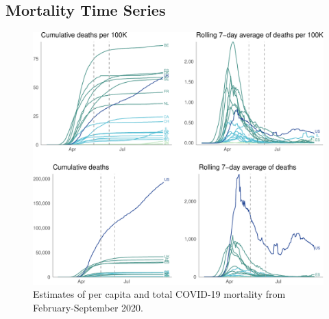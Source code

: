 \documentclass[
]{article}
\begin{document}
\hypertarget{mortality-time-series}{%
\subsection{Mortality Time Series}\label{mortality-time-series}}

\begin{figure}
\centering
\includegraphics{extended_supplement_FINAL_files/figure-latex/deaths-1.pdf}
\caption{Estimates of per capita and total COVID-19 mortality from
February-September 2020.}
\end{figure}

\pagebreak
\end{document}
